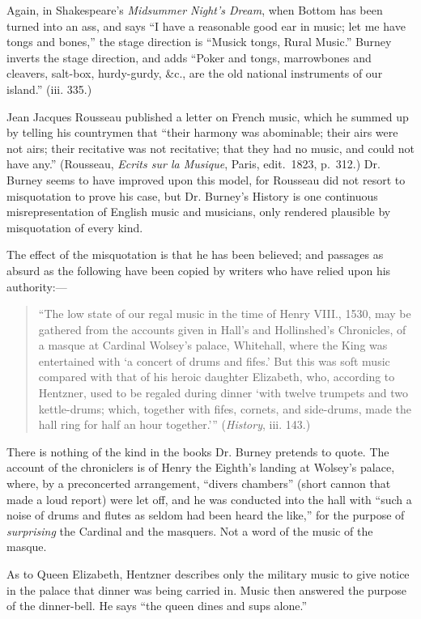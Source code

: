 Again, in Shakespeare’s \textit{Midsummer Night’s Dream}, when Bottom has been
turned into an ass, and says “I have a reasonable good ear in music; let me have
tongs and bones,” the stage direction is “Musick tongs, Rural Music.” Burney
inverts the stage direction, and adds “Poker and tongs, marrowbones and cleavers,
salt-box, hurdy-gurdy, \&c., are the old national instruments of our island.”
(iii. 335.)

Jean Jacques Rousseau published a letter on French music, which he summed
up by telling his countrymen that “their harmony was abominable; their airs
were not airs; their recitative was not recitative; that they had no music, and
could not have any.” (Rousseau, \textit{Ecrits sur la Musique}, Paris, edit.~1823,
p.~312.) Dr. Burney seems to have improved upon this model, for Rousseau did
not resort to misquotation to prove his case, but Dr. Burney’s History is one
continuous misrepresentation of English music and musicians, only rendered
plausible by misquotation of every kind.

The effect of the misquotation is that he has been believed; and passages as
absurd as the following have been copied by writers who have relied upon his
authority:—

\begin{quotation}“The low state of our regal music in the time of Henry VIII., 1530, may be
gathered from the accounts given in Hall’s and Hollinshed’s Chronicles, of a masque
at Cardinal Wolsey’s palace, Whitehall, where the King was entertained with
‘a concert of drums and fifes.’ But this was soft music compared with that of
his heroic daughter Elizabeth, who, according to Hentzner, used to be regaled
during dinner ‘with twelve trumpets and two kettle-drums; which, together with
fifes, cornets, and side-drums, made the hall ring for half an hour together.’”
(\textit{History}, iii. 143.)
\end{quotation}
 

There is nothing of the kind in the 
books Dr. Burney pretends to quote. The 
account of the chroniclers is of \pagebreak
Henry the Eighth’s landing at Wolsey’s palace,
where, by a preconcerted arrangement, “divers chambers” (short cannon that 
made a loud report) were let off, and he was conducted into the hall with “such
a noise of drums and flutes as seldom had been heard the like,” for the purpose
of \textit{surprising} the Cardinal and the masquers. Not a word of the music of the
masque.

As to Queen Elizabeth, Hentzner describes only the military music to give notice
in the palace that dinner was being carried in. Music then answered the purpose
of the dinner-bell. He says “the queen dines and sups alone.”

